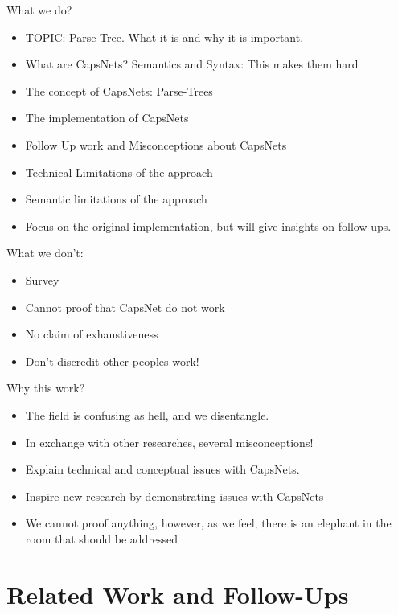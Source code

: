 \documentclass{article}
\begin{document}
What we do?
\begin{itemize}
	\item TOPIC: Parse-Tree. What it is and why it is important.
	\item What are CapsNets? Semantics and Syntax: This makes them hard
	\item The concept of CapsNets: Parse-Trees
	\item The implementation of CapsNets
	\item Follow Up work and Misconceptions about CapsNets
	\item Technical Limitations of the approach
	\item Semantic limitations of the approach
	\item Focus on the original implementation, but will give insights on follow-ups.
\end{itemize}

What we don't:
\begin{itemize}
	\item Survey
	\item Cannot proof that CapsNet do not work
	\item No claim of exhaustiveness
	\item Don't discredit other peoples work!
\end{itemize}

Why this work?
\begin{itemize}
	\item The field is confusing as hell, and we disentangle.
	\item In exchange with other researches, several misconceptions!
	\item Explain technical and conceptual issues with CapsNets.
	\item Inspire new research by demonstrating issues with CapsNets
	\item We cannot proof anything, however, as we feel, there is an elephant in the room that should be addressed
\end{itemize}

\section{Related Work and Follow-Ups}
\end{document}
